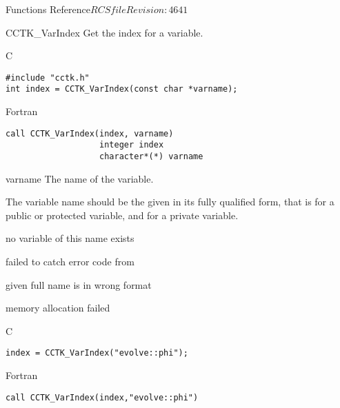 \begin{cactuspart}{ Functions Reference}{$RCSfile$}{$Revision: 4641 $}
\begin{FunctionDescription}{CCTK\_VarIndex}{}
\label{CCTK-VarIndex}
Get the index for a variable.
\begin{SynopsisSection}
\begin{Synopsis}{C}
\begin{verbatim}
#include "cctk.h"
int index = CCTK_VarIndex(const char *varname);
\end{verbatim}
\end{Synopsis}
\begin{Synopsis}{Fortran}
\begin{verbatim}
call CCTK_VarIndex(index, varname)
                   integer index
                   character*(*) varname
\end{verbatim}
\end{Synopsis}
\end{SynopsisSection}

\begin{ParameterSection}
\begin{Parameter}{varname}
The name of the variable.
\end{Parameter}
\end{ParameterSection}

\begin{Discussion}
The variable name should be the given in its fully qualified form,
that is  for a public or protected
variable, and  for a private variable.
\end{Discussion}

\begin{ErrorSection}
\begin{Error}{-1}
no variable of this name exists
\end{Error}
\begin{Error}{-2}
failed to catch error code from 
\end{Error}
\begin{Error}{-3}
given full name is in wrong format
\end{Error}
\begin{Error}{-4}
memory allocation failed
\end{Error}
\end{ErrorSection}
\begin{ExampleSection}
\begin{Example}{C}
\begin{verbatim}
index = CCTK_VarIndex("evolve::phi");
\end{verbatim}
\end{Example}
\begin{Example}{Fortran}
\begin{verbatim}
call CCTK_VarIndex(index,"evolve::phi")
\end{verbatim}
\end{Example}
\end{ExampleSection}
\end{FunctionDescription}



\end{cactuspart}

